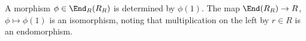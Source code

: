 A morphism $\phi  \in \End_R(R_R)$ is determined by $\phi(1)$. The
map $\End(R_R)\to R$, $\phi\mapsto \phi(1)$ is an isomorphism, noting that
multiplication on the left by $r \in R$ is an endomorphism.
